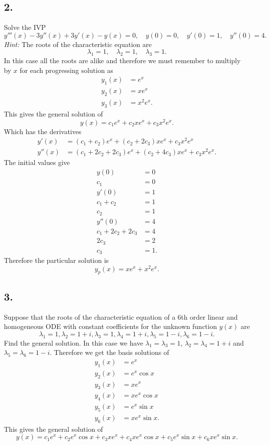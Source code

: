\subsection*{2.} Solve the IVP
\[ 
y'''(x) - 3y''(x) + 3y'(x) - y(x) = 0, \quad y(0) = 0, \quad y'(0) = 1, \quad y''(0) = 4
.\]
\textit{Hint:} The roots of the characteristic equation are
\[ 
\lambda_1 = 1, \quad \lambda_2 = 1, \quad \lambda_3 = 1
.\]
\bigbreak
In this case all the roots are alike and therefore we must remember to multiply by $x$ for each progressing solution as
\begin{align*}
  y_1(x) &= e^{x} \\
  y_2 (x) &= x e^{x} \\
  y_3(x) &= x^2 e^{x}
.\end{align*}
This gives the general solution of
\[ 
y(x) = c_1 e^{x} + c_2 x e^{x} + c_3 x^2 e^{x}
.\]
Which has the derivatives
\begin{align*}
  y'(x) &= (c_1 + c_2) e^{x} + (c_2 + 2c_3) xe^{x} + c_3 x^2 e^{x} \\
  y''(x) &= (c_1 + 2c_2 + 2c_3) e^{x} + (c_2 + 4c_3) xe^{x} + c_3 x^2 e^{x}
.\end{align*}
The initial values give
\begin{align*}
  y(0) &= 0 \\
  c_1 &= 0 \\
  y'(0) &= 1 \\
  c_1 + c_2 &= 1 \\
  c_2 &= 1 \\
  y''(0) &= 4 \\
  c_1 + 2c_2 + 2c_3 &= 4 \\
  2c_3 &= 2 \\
  c_3 &= 1
.\end{align*}
Therefore the particular solution is
\[ 
y_p(x) = x e^{x} + x^2 e^{x}
.\]


\subsection*{3.} Suppose that the roots of the characteristic equation of a 6th order linear and homogeneous ODE with constant coefficients for the unknown function $y(x)$ are
\[ 
\lambda_1 = 1, \lambda_2 = 1+i, \lambda_3 = 1, \lambda_4 = 1 + i, \lambda_5 = 1-i, \lambda_6 = 1-i
.\]
Find the general solution.
\bigbreak
In this case we have $\lambda_1 = \lambda_3 = 1$, $\lambda_2 = \lambda_4 = 1 + i$ and $\lambda_5 = \lambda_6 = 1-i$. Therefore we get the basis solutions of
\begin{align*}
  y_1(x) &= e^{x} \\
  y_2(x) &= e^{x} \cos x \\
  y_3(x) &= xe^{x} \\
  y_4(x) &= x e^{x} \cos x \\
  y_5(x) &= e^{x} \sin x \\
  y_6(x) &= x e^{x} \sin x
.\end{align*}
This gives the general solution of
\[ 
y(x) = c_1 e^{x} + c_2 e^{x} \cos x + c_3 xe^{x} + c_4 xe^{x}\cos x + c_5 e^{x} \sin x + c_6 x e^{x} \sin x
.\]



